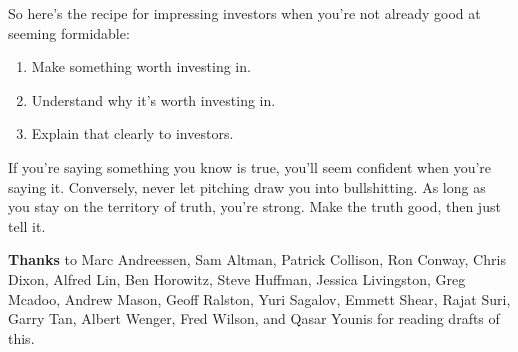So here's the recipe for impressing investors when you're not already
good at seeming formidable:

\begin{enumerate}
\def\labelenumi{\arabic{enumi}.}
\item
  Make something worth investing in.
\item
  Understand why it's worth investing in.
\item
  Explain that clearly to investors.
\end{enumerate}

If you're saying something you know is true, you'll seem confident when
you're saying it. Conversely, never let pitching draw you into
bullshitting. As long as you stay on the territory of truth, you're
strong. Make the truth good, then just tell it.


\textbf{Thanks} to Marc Andreessen, Sam Altman, Patrick Collison, Ron
Conway, Chris Dixon, Alfred Lin, Ben Horowitz, Steve Huffman, Jessica
Livingston, Greg Mcadoo, Andrew Mason, Geoff Ralston, Yuri Sagalov,
Emmett Shear, Rajat Suri, Garry Tan, Albert Wenger, Fred Wilson, and
Qasar Younis for reading drafts of this.
